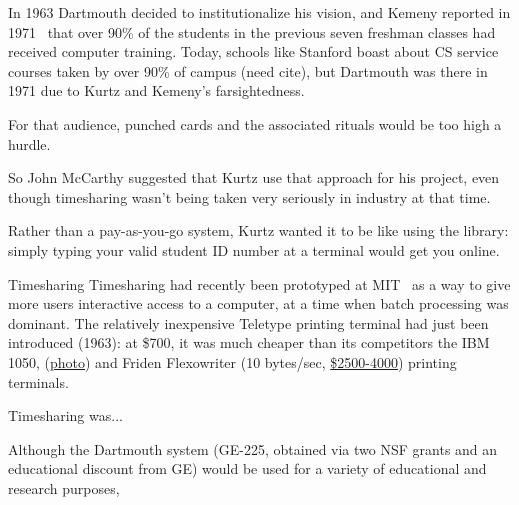 \documentclass{article}
\begin{document}
In 1963 Dartmouth decided to
institutionalize his vision, and Kemeny reported in
1971~\cite{man_and_computer} that
over 90\% of the students in the previous seven freshman classes had
received computer training.  Today, schools like Stanford boast about
CS service courses taken by over 90\% of campus (need cite), but
Dartmouth was there in 1971 due to Kurtz and Kemeny's farsightedness.

For that audience, punched cards and the associated rituals would be too
high a hurdle.

So John McCarthy suggested that Kurtz use that approach for his project,
even though timesharing wasn't being taken very seriously in industry at
that time.

Rather than a
pay-as-you-go system, Kurtz wanted it to be like using the library:
simply typing your valid student ID number at a terminal would get you
online.



\begin{milestone}{Timesharing}
Timesharing had recently been prototyped at
MIT~\cite{corbato62timesharing} as a way to give more users interactive
access to a computer, at a time when
batch processing was dominant.
The relatively inexpensive Teletype
 printing terminal had just been introduced (1963): at \$700,
it was much cheaper than its competitors the IBM 1050, 
(\href{http://www.science.uva.nl/museum/ibm1050.php}{photo}) and
Friden Flexowriter (10 bytes/sec,
\href{http://retrotechnology.com/herbs_stuff/flex_behr.html}{\$2500-4000})
printing terminals.


 Timesharing was...
\end{milestone}

 


Although the Dartmouth system (GE-225, obtained via two NSF grants and
an educational discount from GE) would be used for a variety of
educational and research purposes, 
\end{document}

